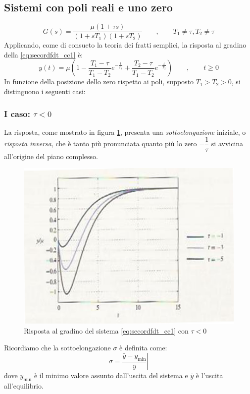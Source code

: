 \documentclass[a4paper]{report}
\begin{document}
\subsection{Sistemi con poli reali e uno zero}
\begin{equation}\label{eq:secordfdt_cc1}
  G(s)= \dfrac{\mu(1 + \tau s)}{(1 + sT_1)(1 + sT_2)}\qquad, \qquad
  T_1\neq\tau, T_2\neq \tau 
\end{equation}
Applicando, come di consueto la teoria dei fratti semplici, la
risposta al gradino della \ref{eq:secordfdt_cc1} \`e: 
\begin{equation}\label{eq:rispgradsec_cc1}
  y(t) = \mu \left( 1 - \dfrac{T_1-\tau}{T_1 - T_2}e^{-\frac{t}{T_1}} + 
  \dfrac{T_2 - \tau}{T_1 - T_2}e^{-\frac{t}{T_2}}\right) \qquad,
  \qquad t\ge0 
\end{equation}
In funzione della posizione dello zero rispetto ai poli, supposto $T_1
> T_2 > 0$, si distinguono i seguenti casi:

\subsubsection{I caso: $\tau < 0$}
La risposta, come mostrato in figura \ref{fig:risp3}, presenta una
\emph{sottoelongazione} iniziale, o {\em
  risposta inversa}, che \`e tanto pi\`u
pronunciata quanto pi\`u lo zero $- \dfrac{1}{\tau}$ si avvicina
all'origine del piano complesso. 
\begin{figure}[!h]
\begin{center}
\includegraphics[scale=0.5]{./figures/rispscal3.png}
\caption{Risposta al gradino del sistema \ref{eq:secordfdt_cc1} con
  $\tau < 0$} \label{fig:risp3}
\end{center}
\end{figure}
Ricordiamo che la sottoelongazione $\sigma$
\`e definita come:
\begin{equation}
  \sigma  = \left . \frac{{\bar y - y_{\min }}}{{\bar y}} \right|
\end{equation}
dove $y_{\min }$ \`e il minimo valore assunto dall'uscita del sistema
e $\bar{y}$ \`e l'uscita all'equilibrio.
\end{document}
